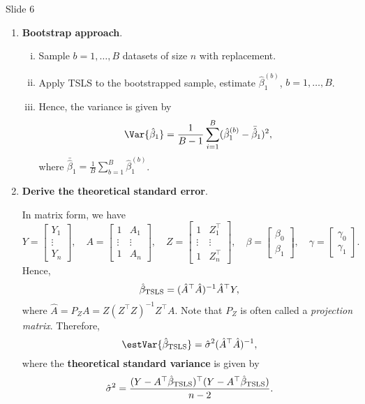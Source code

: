 \begin{Regular}{Slide 6}
    \begin{enumerate}[(1)]
        \item \textbf{Bootstrap approach}.
              \begin{enumerate}[(i)]
                  \item Sample $ b=1,\ldots,B $ datasets of size $ n $ with replacement.
                  \item Apply TSLS to the bootstrapped sample, estimate $ \hat{\beta}_1^{(b)} $, $ b=1,\ldots,B $.
                  \item Hence, the variance is given by
                        \[ \Var{\hat{\beta}_1}=\frac{1}{B-1}\sum_{i=1}^{B}(\hat{\beta}_1^{(b)}-\bar{\hat{\beta}}_1)^2, \]
                        where $ \bar{\hat{\beta}}_1=\frac{1}{B}\sum_{b=1}^{B}\hat{\beta}_1^{(b)} $.
              \end{enumerate}
        \item \textbf{Derive the theoretical standard error}.

              In matrix form, we have
              \[ Y=\begin{bmatrix}
                      Y_1 \\\vdots\\Y_n
                  \end{bmatrix},\quad A=\begin{bmatrix}
                      1      & A_1    \\
                      \vdots & \vdots \\
                      1      & A_n
                  \end{bmatrix},\quad
                  Z=\begin{bmatrix}
                      1      & Z_1^\top \\
                      \vdots & \vdots   \\
                      1      & Z_n^\top
                  \end{bmatrix},\quad
                  \beta=\begin{bmatrix}
                      \beta_0 \\
                      \beta_1
                  \end{bmatrix},\quad
                  \gamma=\begin{bmatrix}
                      \gamma_0 \\
                      \gamma_1
                  \end{bmatrix}. \]
              Hence,
              \[ \hat{\beta}_{\text{TSLS}}=(\hat{A}^\top \hat{A})^{-1}\hat{A}^\top Y, \]
              where $ \hat{A}=P_Z A=Z(Z^\top Z)^{-1}Z^\top A $. Note that $ P_Z $ is often called a \emph{projection matrix}.
              Therefore,
              \[ \estVar{\hat{\beta}_{\TSLS}}=\hat{\sigma}^2(\hat{A}^\top \hat{A})^{-1}, \]
              where the \textbf{theoretical standard variance} is given by
              \[ \hat{\sigma}^2=\frac{(Y-A^\top\hat{\beta}_{\text{TSLS}})^\top(Y-A^\top\hat{\beta}_{\text{TSLS}})}{n-2}. \]
    \end{enumerate}
\end{Regular}
